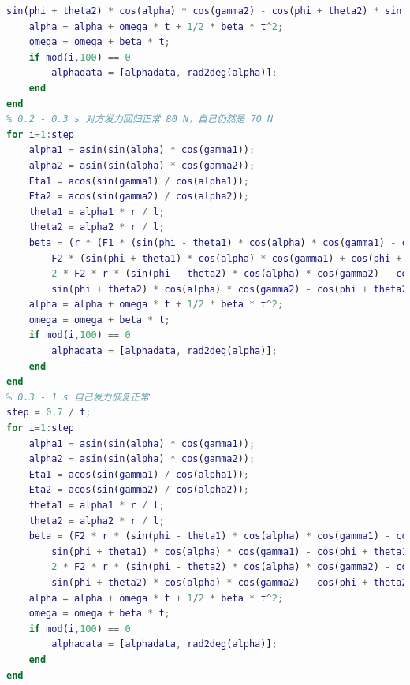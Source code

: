 \documentclass{cumcm}
\begin{document}
\begin{lstlisting}[language=matlab]
        sin(phi + theta2) * cos(alpha) * cos(gamma2) - cos(phi + theta2) * sin(alpha2) * sin(Eta2))) / J;
    alpha = alpha + omega * t + 1/2 * beta * t^2;
    omega = omega + beta * t;
    if mod(i,100) == 0
        alphadata = [alphadata, rad2deg(alpha)];
    end
end
% 0.2 - 0.3 s 对方发力回归正常 80 N，自己仍然是 70 N
for i=1:step
    alpha1 = asin(sin(alpha) * cos(gamma1));
    alpha2 = asin(sin(alpha) * cos(gamma2));
    Eta1 = acos(sin(gamma1) / cos(alpha1));
    Eta2 = acos(sin(gamma2) / cos(alpha2));
    theta1 = alpha1 * r / l;
    theta2 = alpha2 * r / l;
    beta = (r * (F1 * (sin(phi - theta1) * cos(alpha) * cos(gamma1) - cos(phi - theta1) * sin(alpha1) * sin(Eta1)) - ...
        F2 * (sin(phi + theta1) * cos(alpha) * cos(gamma1) + cos(phi + theta1) * sin(alpha1) * sin(Eta1))) + ...
        2 * F2 * r * (sin(phi - theta2) * cos(alpha) * cos(gamma2) - cos(phi - theta2) * sin(alpha2) * sin(Eta2) - ...
        sin(phi + theta2) * cos(alpha) * cos(gamma2) - cos(phi + theta2) * sin(alpha2) * sin(Eta2))) / J;
    alpha = alpha + omega * t + 1/2 * beta * t^2;
    omega = omega + beta * t;
    if mod(i,100) == 0
        alphadata = [alphadata, rad2deg(alpha)];
    end
end
% 0.3 - 1 s 自己发力恢复正常
step = 0.7 / t;
for i=1:step
    alpha1 = asin(sin(alpha) * cos(gamma1));
    alpha2 = asin(sin(alpha) * cos(gamma2));
    Eta1 = acos(sin(gamma1) / cos(alpha1));
    Eta2 = acos(sin(gamma2) / cos(alpha2));
    theta1 = alpha1 * r / l;
    theta2 = alpha2 * r / l;
    beta = (F2 * r * (sin(phi - theta1) * cos(alpha) * cos(gamma1) - cos(phi - theta1) * sin(alpha1) * sin(Eta1) - ...
        sin(phi + theta1) * cos(alpha) * cos(gamma1) - cos(phi + theta1) * sin(alpha1) * sin(Eta1)) + ...
        2 * F2 * r * (sin(phi - theta2) * cos(alpha) * cos(gamma2) - cos(phi - theta2) * sin(alpha2) * sin(Eta2) - ...
        sin(phi + theta2) * cos(alpha) * cos(gamma2) - cos(phi + theta2) * sin(alpha2) * sin(Eta2))) / J;
    alpha = alpha + omega * t + 1/2 * beta * t^2;
    omega = omega + beta * t;
    if mod(i,100) == 0
        alphadata = [alphadata, rad2deg(alpha)];
    end
end
\end{lstlisting}
\end{document}
